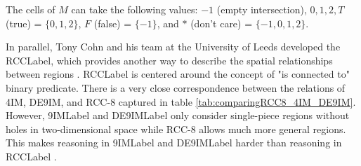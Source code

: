 The cells of \( M \) can take the following values: \( -1 \) (empty intersection), \( 0, 1, 2, T \) (true) = \(\{0, 1, 2\}\), \( F \) (false) = \(\{-1\}\), and \( * \) (don’t care) = \(\{-1, 0, 1, 2\}\).


In parallel, Tony Cohn and his team at the University of Leeds developed the \acrfull{RCCLabel}, which provides another way to describe the spatial relationships between regions \cite{randellSpatialLogicBased1992}. \acrshort{RCCLabel} is centered around the concept of "is connected to" binary predicate. There is a very close correspondence between the relations of 4IM, DE9IM, and RCC-8 captured in table \ref{tab:comparingRCC8_4IM_DE9IM}. However, \acrshort{9IMLabel} and \acrshort{DE9IMLabel} only consider single-piece regions without holes in two-dimensional space while RCC-8 allows much more general regions. This makes reasoning in \acrshort{9IMLabel} and \acrshort{DE9IMLabel} harder than reasoning in \acrshort{RCCLabel} \cite{grigniTopologicalInference1995, renzCanonicalModelRegion2002}.
    

\begin{table}[h!tb]
   \centering \caption{Comparing 4IM, RCC-8, and DE9IM}
   \label{tab:comparingRCC8_4IM_DE9IM}
   \vskip 0.2cm
 \end{table}

